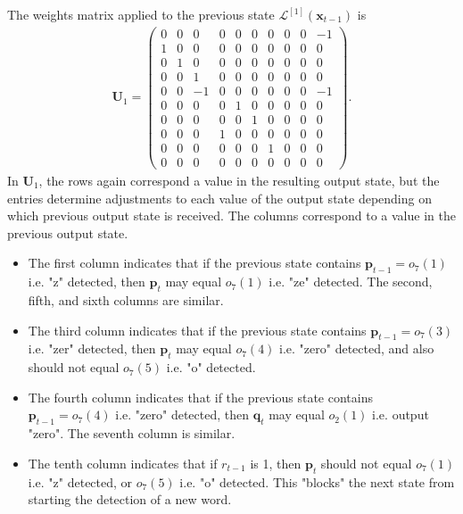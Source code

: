 \documentclass{somasmsc}
\begin{document}
The weights matrix applied to the previous state $\mathcal{L}^{\left[1\right]}\left(\pmb{x}_{t-1}\right)$ is
\begin{align}
\mathbf{U}_1 =
\begin{pmatrix}
0 & 0 &  0 & 0 & 0 & 0 & 0 & 0 & 0 & -1\\
1 & 0 &  0 & 0 & 0 & 0 & 0 & 0 & 0 &  0\\
0 & 1 &  0 & 0 & 0 & 0 & 0 & 0 & 0 &  0\\
0 & 0 &  1 & 0 & 0 & 0 & 0 & 0 & 0 &  0\\
0 & 0 & -1 & 0 & 0 & 0 & 0 & 0 & 0 & -1\\
0 & 0 &  0 & 0 & 1 & 0 & 0 & 0 & 0 &  0\\
0 & 0 &  0 & 0 & 0 & 1 & 0 & 0 & 0 &  0\\
0 & 0 &  0 & 1 & 0 & 0 & 0 & 0 & 0 &  0\\
0 & 0 &  0 & 0 & 0 & 0 & 1 & 0 & 0 &  0\\
0 & 0 &  0 & 0 & 0 & 0 & 0 & 0 & 0 &  0
\end{pmatrix}.
\end{align}
In $\mathbf{U}_1$, the rows again correspond a value in the resulting output state, but the entries determine adjustments to each value of the output state depending on which previous output state is received. The columns correspond to a value in the previous output state.
\begin{itemize}
    \item The first column indicates that if the previous state contains $\pmb{p}_{t-1} = o_7\left(1\right)$ i.e. "z" detected, then $\pmb{p}_t$ may equal $o_7\left(1\right)$ i.e. "ze" detected. The second, fifth, and sixth columns are similar.
    \item The third column indicates that if the previous state contains $\pmb{p}_{t-1} = o_7\left(3\right)$ i.e. "zer" detected, then $\pmb{p}_t$ may equal $o_7\left(4\right)$  i.e. "zero" detected, and also should not equal $o_7\left(5\right)$ i.e. "o" detected.
    \item The fourth column indicates that if the previous state contains $\pmb{p}_{t-1} = o_7\left(4\right)$ i.e. "zero" detected, then $\pmb{q}_t$ may equal $o_2\left(1\right)$ i.e. output "zero". The seventh column is similar.
    \item The tenth column indicates that if $r_{t-1}$ is 1, then $\pmb{p}_t$ should not equal $o_7\left(1\right)$ i.e. "z" detected, or $o_7\left(5\right)$ i.e. "o" detected. This "blocks" the next state from starting the detection of a new word.
\end{itemize}
\end{document}
